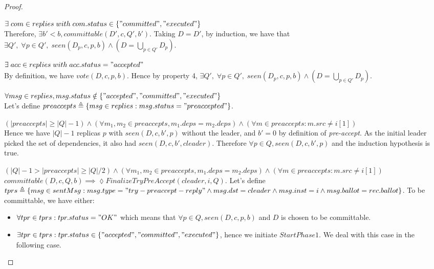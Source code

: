 \documentclass[a4paper]{article}
\theoremstyle{definition}
\theoremstyle{plain}
\begin{document}
\begin{proof}
    \begin{case}
        \item $\exists \; com \in replies \; with \; com.status \in \{"committed", "executed"\}$ \\
        Therefore, $\exists b' < b , committable(D',c,Q',b')$. Taking $D=D'$, by induction, we have that $\exists Q', \; \forall p \in Q', \; seen(D_p,c,p,b) \wedge (D = \bigcup_{p \in Q'}{D_p})$.\\

        \item $\exists \; acc \in replies \; with \; acc.status = "accepted" $ \\
        By definition, we have $vote(D,c,p,b)$. Hence by property 4, $\exists Q', \; \forall p \in Q', \; seen(D_p,c,p,b) \wedge (D = \bigcup_{p \in Q'}{D_p})$.

        \item $\forall msg \in replies, msg.status \notin \{"accepted", "committed", "executed"\}$ \\
        Let's define $preaccepts \triangleq \{msg \in replies : msg.status = "preaccepted" \}$.
        
        \begin{case}
            \item $(|preaccepts| \geq |Q|-1)  \wedge (\forall m_1,m_2 \in preaccepts, m_1.deps = m_2.deps) \wedge (\forall m \in preaccepts : m.src \neq i[1])$\\
            Hence we have $|Q|-1$ replicas $p$ with $seen(D,c,b',p)$ without the leader, and $b'=0$ by definition of \textit{pre-accept}. As the initial leader picked the set of dependencies, it also had $seen(D,c,b',cleader)$. Therefore $\forall p \in Q, seen(D,c,b',p)$ and the induction hypothesis is true.
            
            \item $(|Q|-1 > |preaccepts| \geq |Q|/2  )  \wedge (\forall m_1,m_2 \in preaccepts, m_1.deps = m_2.deps) \wedge (\forall m \in preaccepts : m.src \neq i[1])$ \\
             $committable(D,c,Q,b) \implies \lozenge FinalizeTryPreAccept(cleader,i,Q)$. Let's define $tprs \triangleq \{msg \in sentMsg : msg.type = "try-preaccept-reply" \wedge msg.dst = cleader \wedge msg.inst = i \wedge msg.ballot = rec.ballot\}$. To be committable, we have either: 
            \begin{itemize}
                \item $\forall tpr \in tprs : tpr.status = "OK"$ which means that $\forall p \in Q, seen(D,c,p,b)$ and $D$ is chosen to be committable.
                \item $\exists tpr \in tprs : tpr.status \in \{"accepted", "committed", "executed"\}$, hence we initiate $StartPhase1$. We deal with this case in the following case.
            \end{itemize}


\end{case}
\end{case}
\end{proof}
\end{document}
